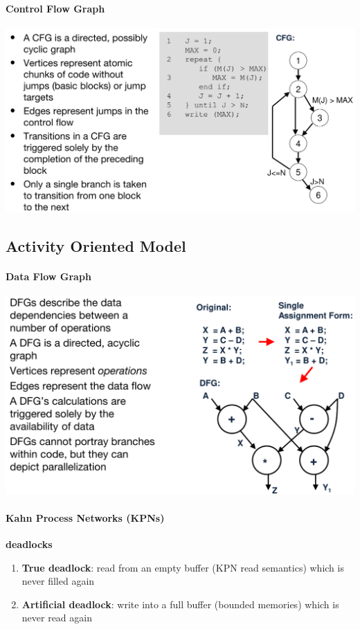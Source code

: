 \documentclass[english]{latex4ei/latex4ei_sheet}
\begin{document}
\paragraph{Control Flow Graph}

\begin{center}
  \includegraphics[width=0.8\linewidth]{assets/ControlFlowGraph.png}
  \label{fig:controlflowgraph}
\end{center}

\subsection{Activity Oriented Model}

\paragraph{Data Flow Graph}
 
\begin{center}
  \includegraphics[width=0.8\linewidth]{assets/DataFlowGraph.png}
  \label{fig:dataflowgraph}
\end{center}

\paragraph{Kahn Process Networks (KPNs)}

\textbf{deadlocks}
\begin{enumerate}
  \item \textbf{True deadlock}: read from an empty buffer (KPN read semantics) which is never filled again
\item \textbf{Artificial deadlock}: write into a full buffer (bounded memories) which is never read again
\end{enumerate}
\end{document}
